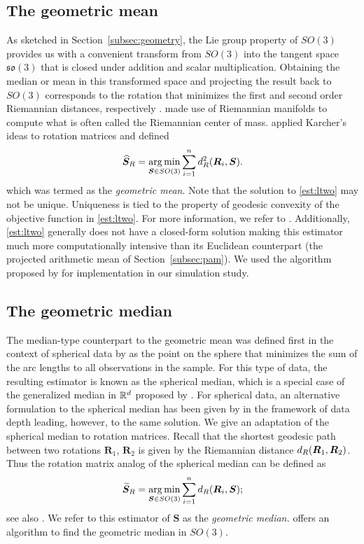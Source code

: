 \subsection{The geometric mean}
\label{section:ltwo}
As sketched in Section~\ref{subsec:geometry}, the Lie group property of $SO(3)$ provides us with a convenient transform from $SO(3)$
into the tangent space $\mathfrak{so}(3)$ that is closed under
addition and scalar multiplication.  Obtaining the median or mean
in this transformed space and projecting the result back to $SO(3)$ corresponds to the rotation that minimizes the first and second order Riemannian
distances, respectively \citep{karcher77, moakher02, fletcher08, fletcher09}.  \citet{karcher77} made use of Riemannian manifolds to compute what is often called the Riemannian
center of mass.  \citet{moakher02} applied Karcher's ideas to
rotation matrices and defined
\begin{equation}\label{est:ltwo}
{\widehat{\bm S}_R}=\operatorname*{arg\,min}_{\bm{S}\in
SO(3)}\sum_{i=1}^n d^2_{R}(\bm{R}_i,\bm{S}).
\end{equation}
which was termed as the \textit{geometric mean}.  Note that the solution to  \eqref{est:ltwo} may not be
unique. Uniqueness is tied to the property of geodesic convexity of the objective function in \eqref{est:ltwo}. For more information, we refer to \citet{moakher02}.  Additionally, \eqref{est:ltwo} generally does not have a closed-form solution making this estimator much more computationally intensive than its Euclidean counterpart (the projected arithmetic mean of Section~\ref{subsec:pam}).  We used the algorithm proposed by \citet{manton04} for implementation in our simulation study.

\subsection{The geometric median}
\label{subsec:lone}
The median-type counterpart to the geometric mean was defined first in the context of
spherical data by \citet{fisher85} as the point on the sphere that minimizes the sum of the arc lengths to all
observations in the sample.   For this type of data, the resulting estimator is known as the spherical median,
 which is a special case of the generalized median in ${\mathbb{R}}^d$
proposed by \citet{gower74}.   For spherical data, an alternative formulation to the
spherical median has been given by \citet{liu92} in the framework of
data depth leading, however, to the same solution. We give an adaptation of the spherical median to rotation matrices. 
Recall that the shortest geodesic path between two rotations ${\bm R_1}$, ${\bm R_2}$ is given by the Riemannian distance ${d_R}(\bm R_1,\bm R_2)$.  Thus the rotation matrix analog of the \cite{fisher85} spherical
median can be defined as
\begin{equation}\label{est:lone}
{\widetilde{\bm S}_R}=\operatorname*{arg\,min}_{\bm{S}\in
SO(3)}\sum_{i=1}^n{d_R}(\bm{R}_i,\bm{S});
\end{equation}
see also \cite{fletcher08, fletcher09}.  We refer to this estimator of $\bm{S}$ as the \textit{geometric median.}  \citet{hartley11} offers an algorithm to find the geometric median in $SO(3)$.

